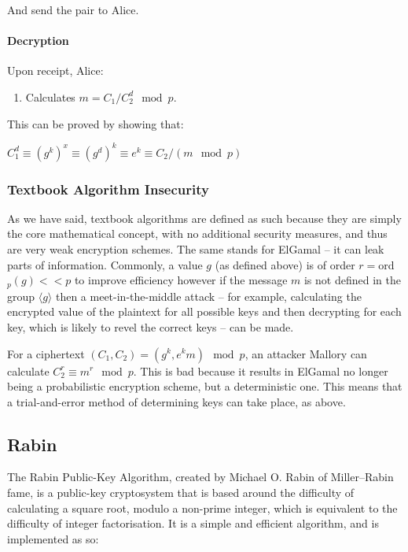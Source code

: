   And send the pair to Alice.
  
  \paragraph{Decryption}
  
  Upon receipt, Alice:
  
  \begin{enumerate}
    \item Calculates $m = C_1/C_2^d \mod p$.
  \end{enumerate}
  
  This can be proved by showing that:
  
  \begin{center}
    $C_1^d \equiv (g^k)^x \equiv (g^d)^k \equiv e^k \equiv C_2/(m \mod p)$
  \end{center}
  
    \subsubsection{Textbook Algorithm Insecurity}
    
    As we have said, textbook algorithms are defined as such because they are simply the core mathematical concept, with no additional security measures, and thus are very weak encryption schemes. The same stands for ElGamal -- it can leak parts of information. Commonly, a value $g$ (as defined above) is of order $r = $ord$_p(g) << p$ to improve efficiency\cite{Mao:2003uq} however if the message $m$ is not defined in the group $\langle g \rangle$ then a meet-in-the-middle attack -- for example, calculating the encrypted value of the plaintext for all possible keys and then decrypting for each key, which is likely to revel the correct keys -- can be made. 
    
    For a ciphertext $(C_1,C_2) = (g^k, e^km) \mod p$, an attacker Mallory can calculate $C_2^r \equiv m^r \mod p$. This is bad because it results in ElGamal no longer being a probabilistic encryption scheme, but a deterministic one. This means that a trial-and-error method of determining keys can take place, as above.
  
  \subsection{Rabin}
  
  The Rabin Public-Key Algorithm, created by Michael O. Rabin of Miller--Rabin fame, is a public-key cryptosystem that is based around the difficulty of calculating a square root, modulo a non-prime integer, which is equivalent to the difficulty of integer factorisation. It is a simple and efficient algorithm, and is implemented as so:
  
